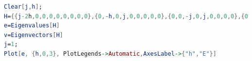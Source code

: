 \documentclass[uplatex,a4j,11pt,dvipdfmx]{jsarticle}
\begin{document}
\newpage
\begin{lstlisting}[language=mathematica, caption=Mathematicaによる固有値方程式の計算コード(式中の$J$をプログラム内では$j$としている)]
Clear[j,h];
H={{j-2h,0,0,0,0,0,0,0,0},{0,-h,0,j,0,0,0,0,0},{0,0,-j,0,j,0,0,0,0},{0,j,0,-h,0,0,0,0,0},{0,0,j,0,0,0,j,0,0},{0,0,0h,0,0,h,0,j,0},{0,0,0,0,j,0,-j,0,0},{0,0,0,0,0,j,0,h,0},{0,0,0,0,0,0,0,0,j+2h}};
e=Eigenvalues[H]
v=Eigenvectors[H]
j=1;
Plot[e, {h,0,3}, PlotLegends->Automatic,AxesLabel->{"h","E"}]
\end{lstlisting}

\end{document}
